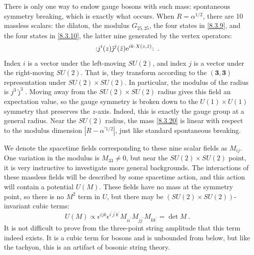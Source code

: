 There is only one way to endow gauge bosons with such mass: spontaneous symmetry breaking, which is exactly what occurs. 
When $R=\alpha^{1 / 2}$, there are 10 massless scalars: the dilaton, the modulus $G_{25,25}$, the four states in \eqref{8.3.9}, and the four states in \eqref{8.3.10}, the latter nine generated by the vertex operators:
\begin{equation}
	: \mathrel{j^{i}(z) \tilde{\jmath}^{j}(\bar{z}) \mathrm{e}^{i k \cdot X(z, \bar{z})}}: \:. \label{8.3.21}
\end{equation}
Index $i$ is a vector under the left-moving $SU(2)$, and index $j$ is a vector under the right-moving $SU(2)$. That is, they transform according to the $(\bm{3},\bm{3})$ representation under $S U(2) \times S U(2) $. 
In particular, the modulus of the radius is $j^{3} \tilde{\jmath}^{3}$. 
Moving away from the $S U(2) \times S U(2)$ radius gives this field an expectation value, 
so the gauge symmetry is broken down to the $U(1) \times U(1)$ symmetry that preserves the $z$-axis. Indeed, this is exactly the gauge group at a general radius. 
Near the $SU(2)$ radius, 
the mass \eqref{8.3.20} is linear with respect to the modulus dimension $|R-\alpha^{\prime 1 / 2}|$, just like standard spontaneous breaking. 

We denote the spacetime fields corresponding to these nine scalar fields as $M_{i j} $. 
One variation in the modulus is $M_{33} \neq 0$, but near the $S U(2) \times S U(2)$ point, it is very instructive to investigate more general backgrounds. The interactions of these massless fields will be described by some spacetime action, and this action will contain a potential $U(M)$. 
These fields have no mass at the symmetry point, so there is no $M^{2}$ term in $U$, 
but there may be $(S U(2) \times S U(2))$-invariant cubic terms:
\begin{equation}
	U(M) \propto \epsilon^{i j k} \epsilon^{i^{\prime} j^{\prime} k^{\prime}} M_{i i^{\prime}} M_{j j^{\prime}} M_{k k^{\prime}}=\operatorname{det} M \:. \label{8.3.22}
\end{equation}
It is not difficult to prove from the three-point string amplitude that this term indeed exists. It is a cubic term for bosons and is unbounded from below, but like the tachyon, this is an artifact of bosonic string theory.

